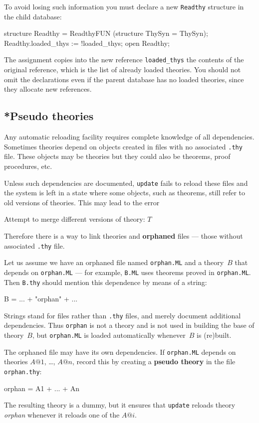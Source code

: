 To avoid losing such information you must declare a new {\tt Readthy}
structure in the child database:
\begin{ttbox}
structure Readthy = ReadthyFUN (structure ThySyn = ThySyn);
Readthy.loaded_thys := !loaded_thys;
open Readthy;
\end{ttbox}
The assignment copies into the new reference \verb$loaded_thys$ the
contents of the original reference, which is the list of already loaded
theories.  You should not omit the declarations even if the parent database
has no loaded theories, since they allocate new references.


\subsection{*Pseudo theories}\label{sec:pseudo-theories}
%
Any automatic reloading facility requires complete knowledge of all
dependencies.  Sometimes theories depend on objects created in \ML{} files
with no associated {\tt.thy} file.  These objects may be theories but they
could also be theorems, proof procedures, etc.

Unless such dependencies are documented, {\tt update} fails to reload these
\ML{} files and the system is left in a state where some objects, such as
theorems, still refer to old versions of theories.  This may lead to the
error
\begin{ttbox}
Attempt to merge different versions of theory: \(T\)
\end{ttbox}
Therefore there is a way to link theories and {\bf orphaned} \ML{} files ---
those without associated {\tt.thy} file.

Let us assume we have an orphaned \ML{} file named {\tt orphan.ML} and a
theory~$B$ that depends on {\tt orphan.ML} --- for example, {\tt B.ML} uses
theorems proved in {\tt orphan.ML}.  Then {\tt B.thy} should
mention this dependence by means of a string:
\begin{ttbox}
B = ... + "orphan" + ...
\end{ttbox}
Strings stand for \ML{} files rather than {\tt.thy} files, and merely
document additional dependencies.  Thus {\tt orphan} is not a theory and is
not used in building the base of theory~$B$, but {\tt orphan.ML} is loaded
automatically whenever~$B$ is (re)built.

The orphaned file may have its own dependencies.  If {\tt orphan.ML}
depends on theories $A@1$, \ldots, $A@n$, record this by creating a {\bf
  pseudo theory} in the file {\tt orphan.thy}:
\begin{ttbox}
orphan = A1 + \(...\) + An
\end{ttbox}
The resulting theory is a dummy, but it ensures that {\tt update} reloads
theory {\it orphan} whenever it reloads one of the $A@i$.

